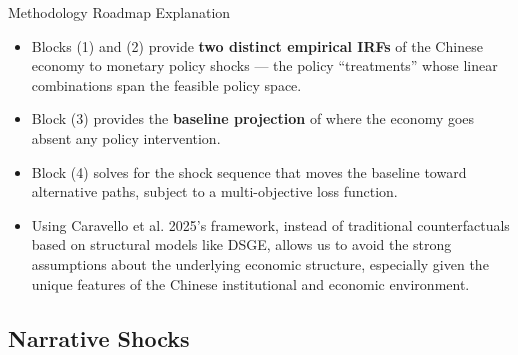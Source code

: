 \documentclass[10pt,aspectratio=169,t]{beamer}
\begin{document}
\begin{frame}{Methodology Roadmap Explanation}
\vspace{0.4em}
\begin{itemize}\itemsep0.2em
  \item Blocks (1) and (2) provide \textbf{two distinct empirical IRFs} of the
        Chinese economy to monetary policy shocks --- the policy ``treatments''
        whose linear combinations span the feasible policy space.
  \item Block (3) provides the \textbf{baseline projection} of where the
        economy goes absent any policy intervention.
  \item Block (4) solves for the shock sequence that moves the baseline
        toward alternative paths, subject to a multi-objective
        loss function.
  \item Using Caravello et al. 2025's framework, instead of traditional counterfactuals based on structural models like DSGE, allows us to avoid the strong assumptions about the underlying economic structure, especially given the unique features of the Chinese institutional and economic environment. 
\end{itemize}

\end{frame}

\subsection{Narrative Shocks}
\end{document}
